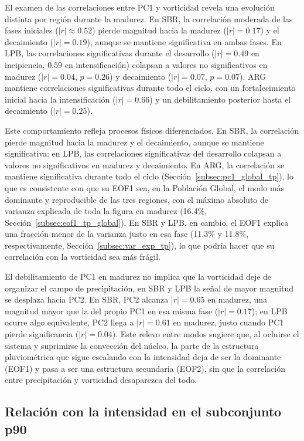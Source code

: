 El examen de las correlaciones entre PC1 y vorticidad revela una evolución distinta por región durante la madurez. En SBR, la correlación moderada de las fases iniciales ($|r|\approx0.52$) pierde magnitud hacia la madurez ($|r|=0.17$) y el decaimiento ($|r|=0.19$), aunque se mantiene significativa en ambas fases. En LPB, las correlaciones significativas durante el desarrollo ($|r|=0.49$ en incipiencia, $0.59$ en intensificación) colapsan a valores no significativos en madurez ($|r|=0.04$, $p=0.26$) y decaimiento ($|r|=0.07$, $p=0.07$). ARG mantiene correlaciones significativas durante todo el ciclo, con un fortalecimiento inicial hacia la intensificación ($|r|=0.66$) y un debilitamiento posterior hasta el decaimiento ($|r|=0.25$).

Este comportamiento refleja procesos físicos diferenciados. En SBR, la correlación pierde magnitud hacia la madurez y el decaimiento, aunque se mantiene significativa; en LPB, las correlaciones significativas del desarrollo colapsan a valores no significativos en madurez y decaimiento. En ARG, la correlación se mantiene significativa durante todo el ciclo (Sección~\ref{subsec:pc1_global_tp}), lo que es consistente con que su EOF1 sea, en la Población Global, el modo más dominante y reproducible de las tres regiones, con el máximo absoluto de varianza explicada de toda la figura en madurez (16.4\%, Sección~\ref{subsec:eof1_tp_global}). En SBR y LPB, en cambio, el EOF1 explica una fracción menor de la varianza justo en esa fase (11.3\% y 11.8\%, respectivamente, Sección~\ref{subsec:var_exp_tp}), lo que podría hacer que su correlación con la vorticidad sea más frágil.

El debilitamiento de PC1 en madurez no implica que la vorticidad deje de organizar el campo de precipitación, en SBR y LPB la señal de mayor magnitud se desplaza hacia PC2. En SBR, PC2 alcanza $|r|=0.65$ en madurez, una magnitud mayor que la del propio PC1 en esa misma fase ($|r|=0.17$); en LPB ocurre algo equivalente, PC2 llega a $|r|=0.61$ en madurez, justo cuando PC1 pierde significancia ($|r|=0.04$). Este relevo entre modos sugiere que, al ocluirse el sistema y suprimirse la convección del núcleo, la parte de la estructura pluviométrica que sigue escalando con la intensidad deja de ser la dominante (EOF1) y pasa a ser una estructura secundaria (EOF2), sin que la correlación entre precipitación y vorticidad desaparezca del todo.



\subsection{Relación con la intensidad en el subconjunto p90}\label{subsec:pc1_p90_tp}

